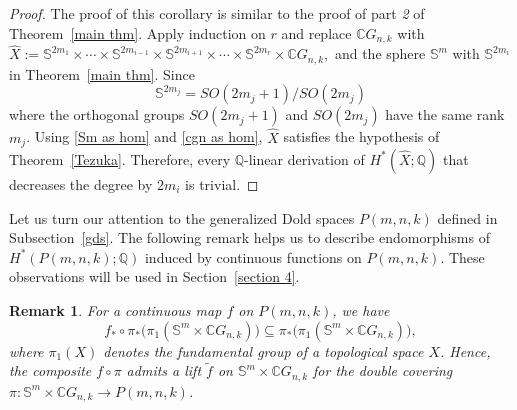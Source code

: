\documentclass{amsart}
\newtheorem{remark}[theorem]{Remark}
\newcommand{\thmref}[1]{Theorem~\ref{#1}}
\newcommand{\secref}[1]{Section~\ref{#1}}
\newcommand{\subsecref}[1]{Subsection~\ref{#1}}
\begin{document}
	\begin{proof}
		The proof of this corollary is similar to the proof of %
part \textit{2} of \thmref{main thm}. Apply induction on $r$ and replace $\mathbb{C}G_{n,k}$ with $\hat{X} := \mathbb{S}^{2m_1}\times\cdots\times \mathbb{S}^{2m_{i-1}}\times \mathbb{S}^{2m_{i+1}}\times\cdots\times \mathbb{S}^{2m_r}\times \mathbb{C}G_{n,k},$ and the sphere $\mathbb{S}^m$ with $\mathbb{S}^{2m_i}$ in \thmref{main thm}. Since \begin{equation}\label{Sm as hom}
			\mathbb S^{2m_j}=SO(2m_j+1)/SO(2m_j)
		\end{equation}
		where %
the orthogonal groups $SO(2m_j+1)$ and $SO(2m_j)$ have the same rank $m_j$. Using \eqref{Sm as hom} and \eqref{cgn as hom}, $\hat{X}$ satisfies the hypothesis of \thmref{Tezuka}. Therefore, every $\mathbb{Q}$-linear derivation of $H^*(\hat{X};\mathbb{Q})$ that decreases the degree by $2m_i$ is trivial.
	\end{proof}
	Let us turn our attention to the generalized Dold spaces $P(m,n,k)$ %
defined in \subsecref{gds}. The following remark helps us to describe endomorphisms of $H^*(P(m,n,k);\mathbb{Q})$ %
induced by continuous functions on $P(m,n,k)$. These observations will be used in \secref{section 4}.
	\begin{remark}\label{lift}
		For a continuous map $f$ on $P(m,n,k)$, we have  
		\begin{equation} \label{lift of f}
			f_*\circ \pi_*\big(\pi_1(\mathbb{S}^m\times \mathbb{C}G_{n,k})\big)
			\subseteq \pi_*\big(\pi_1(\mathbb{S}^m\times \mathbb{C}G_{n,k})\big),
		\end{equation}
		where $\pi_1(X)$ denotes the fundamental group of a topological space $X$. Hence, the composite $f\circ \pi$ admits a lift $\tilde f$ on
		$\mathbb{S}^m\times \mathbb{C}G_{n,k}$ for the double covering  
		$\pi:\mathbb{S}^m\times \mathbb{C}G_{n,k}\to P(m,n,k)$.
	\end{remark}
\end{document}
